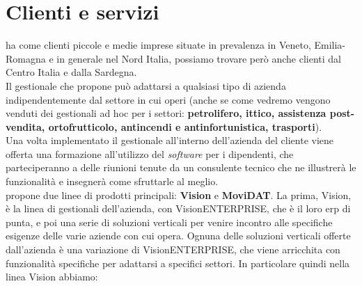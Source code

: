 \section{Clienti e servizi}
{\company} ha come clienti piccole e medie imprese situate in prevalenza in Veneto, Emilia-Romagna e in generale nel Nord Italia, possiamo trovare però 
anche clienti dal Centro Italia e dalla Sardegna. \\
Il gestionale che propone può adattarsi a qualsiasi tipo di azienda indipendentemente dal settore in cui 
operi (anche se come vedremo vengono venduti dei gestionali ad hoc per i settori: \textbf{petrolifero, ittico, assistenza post-vendita, ortofrutticolo, antincendi 
e antinfortunistica, trasporti}).\\ Una volta implementato il gestionale all'interno dell'azienda del cliente viene offerta una formazione all'utilizzo del 
\textit{software} per i dipendenti, che parteciperanno a delle riunioni tenute da un consulente tecnico che ne illustrerà le funzionalità e insegnerà come sfruttarle 
al meglio.\\
{\company} propone due linee di prodotti principali: \textbf{Vision} e \textbf{MoviDAT}.
La prima, Vision, è la linea di gestionali dell'azienda, con VisionENTERPRISE, che è il loro \gls{erp} di punta, 
e poi una serie di soluzioni verticali per venire incontro alle specifiche esigenze delle varie aziende con cui {\company} opera.
Ognuna delle soluzioni verticali offerte dall'azienda è una variazione di VisionENTERPRISE, che viene arricchita con 
funzionalità specifiche per adattarsi a specifici settori. In particolare quindi nella linea Vision abbiamo:

